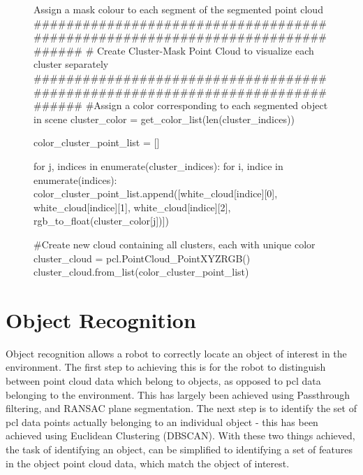 \documentclass[a4paper]{article}
\begin{document}
\begin{figure}[h]\scriptsize
\begin{sexylisting}{Assign a mask colour to each segment of the segmented point cloud}
##############################################################################
    # Create Cluster-Mask Point Cloud to visualize each cluster separately
##############################################################################
    #Assign a color corresponding to each segmented object in scene
    cluster_color = get_color_list(len(cluster_indices))

    color_cluster_point_list = []

    for j, indices in enumerate(cluster_indices):
        for i, indice in enumerate(indices):
            color_cluster_point_list.append([white_cloud[indice][0],
                                            white_cloud[indice][1],
                                            white_cloud[indice][2],
                                            rgb_to_float(cluster_color[j])])

    #Create new cloud containing all clusters, each with unique color
    cluster_cloud = pcl.PointCloud_PointXYZRGB()
    cluster_cloud.from_list(color_cluster_point_list)
\end{sexylisting}
\end{figure}


\section{Object Recognition}
Object recognition allows a robot to correctly locate an object of interest in the environment. The first step to achieving this is for the robot to distinguish between point cloud data which belong to objects, as opposed to pcl data belonging to the environment. This has largely been achieved using Passthrough filtering, and RANSAC plane segmentation. The next step is to identify the set of pcl data points actually belonging to an individual object - this has been achieved using Euclidean Clustering (DBSCAN). With these two things achieved, the task of identifying an object, can be simplified to identifying a set of features in the object point cloud data, which  match the object of interest.\\
\end{document}
